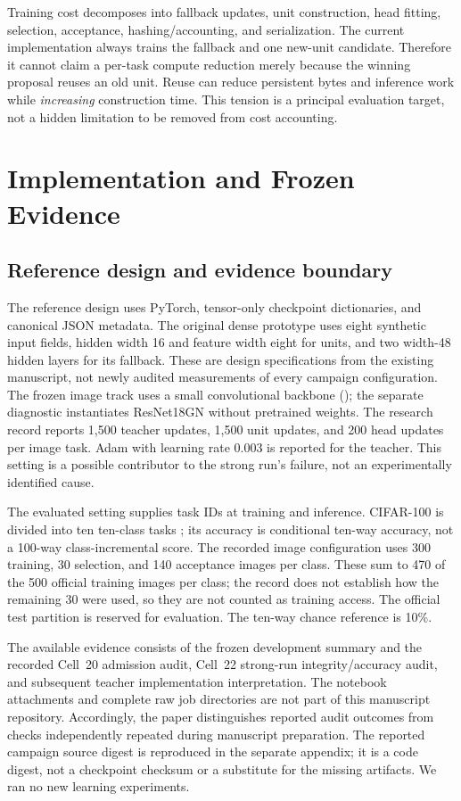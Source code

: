 \documentclass{article}
\begin{document}
Training cost decomposes into fallback updates, unit construction, head fitting, selection, acceptance, hashing/accounting, and serialization. The current implementation always trains the fallback and one new-unit candidate. Therefore it cannot claim a per-task compute reduction merely because the winning proposal reuses an old unit. Reuse can reduce persistent bytes and inference work while \emph{increasing} construction time. This tension is a principal evaluation target, not a hidden limitation to be removed from cost accounting.

\section{Implementation and Frozen Evidence}
\label{sec:implementation}
\subsection{Reference design and evidence boundary}
The reference design uses PyTorch, tensor-only checkpoint dictionaries, and canonical JSON metadata. The original dense prototype uses eight synthetic input fields, hidden width 16 and feature width eight for units, and two width-48 hidden layers for its fallback. These are design specifications from the existing manuscript, not newly audited measurements of every campaign configuration. The frozen image track uses a small convolutional backbone (); the separate diagnostic instantiates ResNet18GN without pretrained weights. The research record reports 1,500 teacher updates, 1,500 unit updates, and 200 head updates per image task. Adam with learning rate 0.003 is reported for the teacher. This setting is a possible contributor to the strong run's failure, not an experimentally identified cause.

The evaluated setting supplies task IDs at training and inference. CIFAR-100 is divided into ten ten-class tasks \cite{krizhevsky2009}; its accuracy is conditional ten-way accuracy, not a 100-way class-incremental score. The recorded image configuration uses 300 training, 30 selection, and 140 acceptance images per class. These sum to 470 of the 500 official training images per class; the record does not establish how the remaining 30 were used, so they are not counted as training access. The official test partition is reserved for evaluation. The ten-way chance reference is 10\%.

The available evidence consists of the frozen development summary and the recorded Cell~20 admission audit, Cell~22 strong-run integrity/accuracy audit, and subsequent teacher implementation interpretation. The notebook attachments and complete raw job directories are not part of this manuscript repository. Accordingly, the paper distinguishes reported audit outcomes from checks independently repeated during manuscript preparation. The reported campaign source digest is reproduced in the separate appendix; it is a code digest, not a checkpoint checksum or a substitute for the missing artifacts. We ran no new learning experiments.
\end{document}

